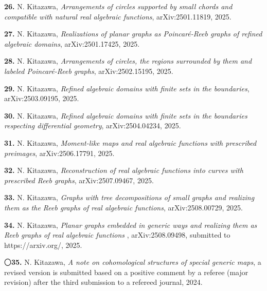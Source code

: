\documentclass{article}
\begin{document}
\par\noindent
{\bf 26.} N. Kitazawa, \textsl{Arrangements of circles supported by small chords and compatible with natural real algebraic functions}, arXiv:2501.11819, 2025.

\par\noindent
{\bf 27.} N. Kitazawa, \textsl{Realizations of planar graphs as Poincar\'e-Reeb graphs of refined algebraic domains}, arXiv:2501.17425, 2025.

\par\noindent
{\bf 28.} N. Kitazawa, \textsl{Arrangements of circles, the regions surrounded by them and labeled Poincar\'e-Reeb graphs}, arXiv:2502.15195, 2025.

\par\noindent
{\bf 29.} N. Kitazawa, \textsl{Refined algebraic domains with finite sets in the boundaries}, arXiv:2503.09195, 2025.

\par\noindent
{\bf 30.} N. Kitazawa, \textsl{Refined algebraic domains with finite sets in the boundaries respecting differential geometry}, arXiv:2504.04234, 2025.
\par\noindent
{\bf 31.}  N. Kitazawa, \textsl{Moment-like maps and real algebraic functions with prescribed preimages}, arXiv:2506.17791, 2025.

\par\noindent
{\bf 32.} N. Kitazawa, \textsl{Reconstruction of real algebraic functions into curves with prescribed Reeb graphs}, arXiv:2507.09467, 2025.

\par\noindent
{\bf 33.} N. Kitazawa, \textsl{Graphs with tree decompositions of small graphs and realizing them as the Reeb graphs of real algebraic functions}, arXiv:2508.00729, 2025.

\par\noindent
{\bf 34.} N. Kitazawa, \textsl{Planar graphs embedded in generic ways and realizing them as Reeb graphs of real algebraic functions }, arXiv:2508.09498, submitted to https://arxiv.org/, 2025.

\par\noindent
〇{\bf 35.} N. Kitazawa, \textsl{A note on cohomological structures of special generic maps}, a revised version is submitted based on a positive comment by a referee (major revision) after the third submission to a refereed journal, 2024. 
%
%
%
\end{document}
